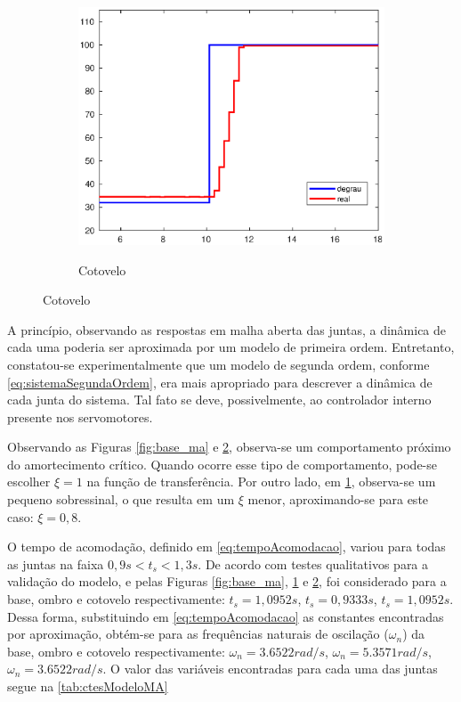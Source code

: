 \begin{figure}[h!]
\begin{subfigure}{.5\textwidth}
    \label{fig:shoulder_ma}
  \end{subfigure}%
  \\[5ex]
  \begin{subfigure}{\textwidth}
    \centering
    \caption{Cotovelo}
    \includegraphics[width = 0.55\columnwidth]{Imagens/forearm_ma}
    \label{fig:forearm_ma}
  \end{subfigure}%
  
  \label{fig:ensaioMalhaAberta} 

\end{figure}

A princípio, observando as respostas em malha aberta das juntas, a dinâmica de cada uma poderia ser aproximada por
um modelo de primeira ordem. Entretanto, constatou-se experimentalmente que um modelo de segunda ordem, 
conforme \eqref{eq:sistemaSegundaOrdem}, era mais apropriado para descrever a dinâmica de cada junta do sistema.
Tal fato se deve, possivelmente, ao controlador interno presente nos servomotores.

Observando as Figuras \ref{fig:base_ma} e \ref{fig:forearm_ma}, observa-se um comportamento próximo do 
amortecimento crítico. Quando ocorre esse tipo de comportamento, pode-se escolher $\xi=1$ na função de 
transferência. Por outro lado, em \ref{fig:shoulder_ma}, observa-se
um pequeno sobressinal, o que resulta em um $\xi$ menor, aproximando-se para este caso: $\xi = 0,8$.

O tempo de acomodação, definido em \eqref{eq:tempoAcomodacao}, variou para todas as juntas na 
faixa $0,9s < t_s < 1,3s$. De acordo com testes qualitativos para a validação do modelo, e pelas Figuras 
\ref{fig:base_ma}, \ref{fig:shoulder_ma} e \ref{fig:forearm_ma}, foi considerado para a base, ombro e
cotovelo respectivamente: $t_s = 1,0952s$, $t_s = 0,9333s$, $t_s = 1,0952s$. Dessa forma, substituindo em 
\eqref{eq:tempoAcomodacao} as constantes encontradas por aproximação, obtém-se para as frequências naturais de
oscilação ($\omega_n$) da base, ombro e
cotovelo respectivamente: $\omega_n = 3.6522 rad/s$, $\omega_n = 5.3571 rad/s$, $\omega_n = 3.6522 rad/s$.
O valor das variáveis encontradas para cada uma das juntas segue na \autoref{tab:ctesModeloMA}

